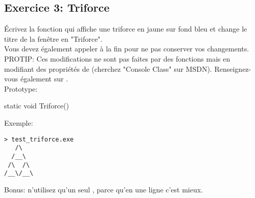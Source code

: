 \subsection{Exercice 3: Triforce}

Écrivez la fonction  qui affiche une triforce en jaune sur fond bleu
et change le titre de la fenêtre en "Triforce".\\
Vous devez également appeler  à la fin pour ne pas
conserver vos changements.\\
PROTIP: Ces modifications ne sont pas faites par des fonctions mais en
modifiant des propriétés de  (cherchez "Console Class" sur MSDN).
Renseignez-vous également sur .\\

Prototype:
\begin{code}
static void Triforce()
\end{code}

Exemple:
\begin{verbatim}
> test_triforce.exe
   /\
  /__\
 /\  /\
/__\/__\
\end{verbatim}

Bonus: n'utilisez qu'un seul , parce qu'en une ligne c'est mieux.

